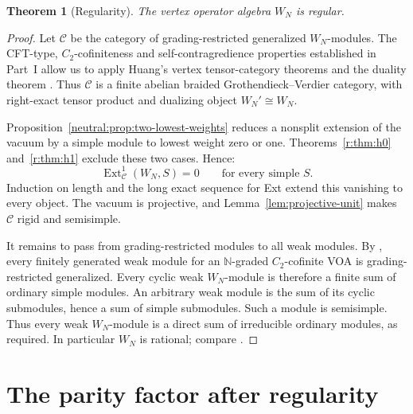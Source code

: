 \documentclass[11pt,a4paper]{article}
\numberwithin{equation}{section}
\newtheorem{theorem}{Theorem}[section]
\theoremstyle{definition}\newtheorem{definition}[theorem]{Definition}
\theoremstyle{remark}\newtheorem{remark}[theorem]{Remark}
\begin{document}
\begin{theorem}[Regularity]\label{r:thm:regularity}
The vertex operator algebra $W_N$ is regular.
\end{theorem}
\begin{proof}
Let $\mathcal C$ be the category of grading-restricted generalized
$W_N$-modules. The CFT-type, $C_2$-cofiniteness and self-contragredience
properties established in Part~I allow us to apply Huang's
vertex tensor-category theorems \cite{huang} and the duality theorem
\cite[Theorem 2.12]{alsw}. Thus $\mathcal C$ is a finite abelian
braided Grothendieck--Verdier category, with right-exact tensor
product and dualizing object $W_N'\cong W_N$.

Proposition~\ref{neutral:prop:two-lowest-weights} reduces a nonsplit
extension of the vacuum by a simple module to lowest weight zero or
one. Theorems~\ref{r:thm:h0} and~\ref{r:thm:h1} exclude these two
cases. Hence:
\begin{equation}\label{r:eq:allvacext}
 \operatorname{Ext}^1_{\mathcal C}(W_N,S)=0
 \qquad\text{for every simple }S.
\end{equation}
Induction on length and the long exact sequence for Ext extend
this vanishing to every object. The vacuum is projective, and
Lemma~\ref{lem:projective-unit} makes $\mathcal C$ rigid and
semisimple.

It remains to pass from grading-restricted modules to all weak
modules. By \cite[Proposition 2.11]{mcrae}, every finitely generated
weak module for an $\mathbb N$-graded $C_2$-cofinite VOA is
grading-restricted generalized. Every cyclic weak $W_N$-module is
therefore a finite sum of ordinary simple modules. An arbitrary
weak module is the sum of its cyclic submodules, hence a sum of
simple submodules. Such a module is semisimple. Thus every weak
$W_N$-module is a direct sum of irreducible ordinary modules, as
required. In particular $W_N$ is rational; compare \cite{abd}.
\end{proof}


\section{The parity factor after regularity}
\label{sec:parity-factor}
\end{document}
